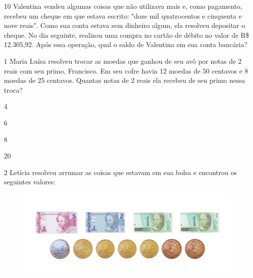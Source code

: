 
\num{10} Valentina vendeu algumas coisas que não utilizava mais e, como
pagamento, recebeu um cheque em que estava escrito: "doze mil quatrocentos
e cinquenta e nove reais". Como sua conta estava sem dinheiro algum, ela
resolveu depositar o cheque. No dia seguinte, realizou uma compra no cartão de débito no valor de R\$ 12.305,92. Após essa operação, qual o
saldo de Valentina em sua conta bancária?




\num{1} Maria Luísa resolveu trocar as moedas que ganhou de seu avô por
notas de 2 reais com seu primo, Francisco. Em seu cofre havia 12 moedas de 50 centavos e 8 moedas de 25 centavos. Quantas notas de 2
reais ela recebeu de seu primo nessa troca?

\begin{escolha}
\item
  4
\item
  6
\item
  8
\item
  20
\end{escolha}


\num{2} Letícia resolveu arrumar as coisas que estavam em sua bolsa e
encontrou os seguintes valores:

\begin{figure}[htpb!]
\includegraphics[width=\textwidth]{../ilustracoes/MAT5/SAEB_5ANO_MAT_figura56.png}
\end{figure}

